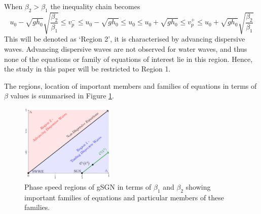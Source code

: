 \documentclass[10pt]{elsarticle}
\begin{document}
When ${\beta_2} >  \beta_1 $ the inequality chain becomes
\begin{equation}
u_0 - \sqrt{gh_0} \sqrt{\dfrac{\beta_2}{ \beta_1}} \le v^-_p \le u_0 -  \sqrt{gh_0} \le  u_0 \le u_0 + \sqrt{gh_0} \le   v^+_p  \le u_0 +  \sqrt{gh_0} \sqrt{\dfrac{\beta_2}{ \beta_1}}
\label{eq:wavespeedbound2}
\end{equation}
This will be denoted as `Region 2', it is characterised by advancing dispersive waves. Advancing dispersive waves are not observed for water waves, and thus none of the equations or family of equations of interest lie in this region. Hence, the study in this paper will be restricted to Region 1.   

The regions, location of important members and families of equations in terms of $\beta$ values is summarised in Figure \ref{Fig:WaveSpeedReg}.
%
\begin{figure}
	\centering
	\includegraphics[width=0.4\textwidth]{./Figures/Explanation/BetaPlotAll.pdf}
	\caption{Phase speed regions of gSGN in terms of $\beta_1$ and $\beta_2$ showing important families of equations and particular members of these families.}
	\label{Fig:WaveSpeedReg}
\end{figure}


\end{document}
